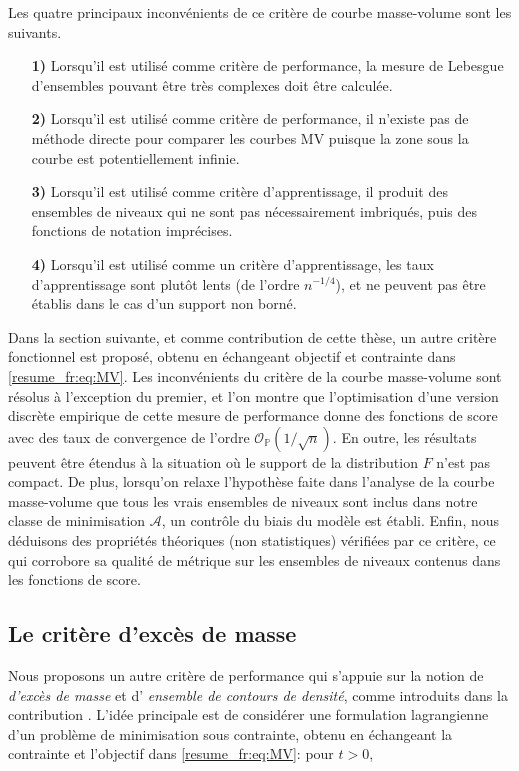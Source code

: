 \documentclass[a4paper, 12pt]{article}
\begin{document}
Les quatre principaux inconvénients de ce critère de courbe masse-volume sont les suivants.

\begin{itemize}
\item[\textbf{1)}] Lorsqu'il est utilisé comme critère de performance, la mesure de Lebesgue d'ensembles pouvant être très complexes doit être calculée.
\item[\textbf{2)}] Lorsqu'il est utilisé comme critère de performance, il n'existe pas de méthode directe pour comparer les courbes MV puisque la zone sous la courbe est potentiellement infinie.
\item[\textbf{3)}] Lorsqu'il est utilisé comme critère d'apprentissage, il produit des ensembles de niveaux qui ne sont pas nécessairement imbriqués, puis des fonctions de notation imprécises.
\item[\textbf{4)}] Lorsqu'il est utilisé comme un critère d'apprentissage, les taux d'apprentissage sont plutôt lents (de l'ordre $ n ^ {- 1/4} $), et ne peuvent pas être établis dans le cas d'un support non borné.
\end{itemize}




Dans la section suivante, et comme contribution de cette thèse, un autre critère fonctionnel est proposé, obtenu en échangeant objectif et contrainte dans \eqref{resume_fr:eq:MV}. Les inconvénients du critère de la courbe masse-volume sont résolus à l'exception du premier, et l'on montre que l'optimisation d'une version discrète empirique de cette mesure de performance donne des fonctions de score avec des taux de convergence de l'ordre $ \mathcal {O} _ {\mathbb {P}} (1 / \sqrt {n}) $. En outre, les résultats peuvent être étendus à la situation où le support de la distribution $ F $ n'est pas compact. De plus, lorsqu'on relaxe l'hypothèse faite dans l'analyse de la courbe masse-volume que tous les vrais ensembles de niveaux sont inclus dans notre classe de minimisation $ \mathcal {A} $, un contrôle du biais du modèle est établi. Enfin, nous déduisons des propriétés théoriques (non statistiques) vérifiées par ce critère, ce qui corrobore sa qualité de métrique sur les ensembles de niveaux contenus dans les fonctions de score.


\subsection{Le critère d'excès de masse}
\label{resume_fr:em-curve}
Nous proposons un autre critère de performance qui s'appuie sur la notion de \textit {d'excès de masse} et d' \textit{ensemble de contours de densité}, comme introduits dans la contribution \cite{Polonik95}. L'idée principale est de considérer une formulation lagrangienne d'un problème de minimisation sous contrainte, obtenu en échangeant la contrainte et l'objectif dans \eqref{resume_fr:eq:MV}: pour $ t> 0 $,
\end{document}

